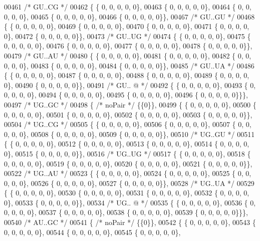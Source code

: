 \begin{DoxyCode}
00461  \textcolor{comment}{/* GU..CG */}
00462 \{ \{  0, 0, 0, 0, 0\},
00463 \{  0, 0, 0, 0, 0\},
00464 \{  0, 0, 0, 0, 0\},
00465 \{  0, 0, 0, 0, 0\},
00466 \{  0, 0, 0, 0, 0\}\},
00467  \textcolor{comment}{/* GU..GU */}
00468 \{ \{  0, 0, 0, 0, 0\},
00469 \{  0, 0, 0, 0, 0\},
00470 \{  0, 0, 0, 0, 0\},
00471 \{  0, 0, 0, 0, 0\},
00472 \{  0, 0, 0, 0, 0\}\},
00473  \textcolor{comment}{/* GU..UG */}
00474 \{ \{  0, 0, 0, 0, 0\},
00475 \{  0, 0, 0, 0, 0\},
00476 \{  0, 0, 0, 0, 0\},
00477 \{  0, 0, 0, 0, 0\},
00478 \{  0, 0, 0, 0, 0\}\},
00479  \textcolor{comment}{/* GU..AU */}
00480 \{ \{  0, 0, 0, 0, 0\},
00481 \{  0, 0, 0, 0, 0\},
00482 \{  0, 0, 0, 0, 0\},
00483 \{  0, 0, 0, 0, 0\},
00484 \{  0, 0, 0, 0, 0\}\},
00485  \textcolor{comment}{/* GU..UA */}
00486 \{ \{  0, 0, 0, 0, 0\},
00487 \{  0, 0, 0, 0, 0\},
00488 \{  0, 0, 0, 0, 0\},
00489 \{  0, 0, 0, 0, 0\},
00490 \{  0, 0, 0, 0, 0\}\},
00491  \textcolor{comment}{/* GU.. @ */}
00492 \{ \{  0, 0, 0, 0, 0\},
00493 \{  0, 0, 0, 0, 0\},
00494 \{  0, 0, 0, 0, 0\},
00495 \{  0, 0, 0, 0, 0\},
00496 \{  0, 0, 0, 0, 0\}\}\},
00497  \textcolor{comment}{/* UG..GC */}
00498 \{ \textcolor{comment}{/* noPair */} \{\{0\}\},
00499 \{ \{  0, 0, 0, 0, 0\},
00500 \{  0, 0, 0, 0, 0\},
00501 \{  0, 0, 0, 0, 0\},
00502 \{  0, 0, 0, 0, 0\},
00503 \{  0, 0, 0, 0, 0\}\},
00504  \textcolor{comment}{/* UG..CG */}
00505 \{ \{  0, 0, 0, 0, 0\},
00506 \{  0, 0, 0, 0, 0\},
00507 \{  0, 0, 0, 0, 0\},
00508 \{  0, 0, 0, 0, 0\},
00509 \{  0, 0, 0, 0, 0\}\},
00510  \textcolor{comment}{/* UG..GU */}
00511 \{ \{  0, 0, 0, 0, 0\},
00512 \{  0, 0, 0, 0, 0\},
00513 \{  0, 0, 0, 0, 0\},
00514 \{  0, 0, 0, 0, 0\},
00515 \{  0, 0, 0, 0, 0\}\},
00516  \textcolor{comment}{/* UG..UG */}
00517 \{ \{  0, 0, 0, 0, 0\},
00518 \{  0, 0, 0, 0, 0\},
00519 \{  0, 0, 0, 0, 0\},
00520 \{  0, 0, 0, 0, 0\},
00521 \{  0, 0, 0, 0, 0\}\},
00522  \textcolor{comment}{/* UG..AU */}
00523 \{ \{  0, 0, 0, 0, 0\},
00524 \{  0, 0, 0, 0, 0\},
00525 \{  0, 0, 0, 0, 0\},
00526 \{  0, 0, 0, 0, 0\},
00527 \{  0, 0, 0, 0, 0\}\},
00528  \textcolor{comment}{/* UG..UA */}
00529 \{ \{  0, 0, 0, 0, 0\},
00530 \{  0, 0, 0, 0, 0\},
00531 \{  0, 0, 0, 0, 0\},
00532 \{  0, 0, 0, 0, 0\},
00533 \{  0, 0, 0, 0, 0\}\},
00534  \textcolor{comment}{/* UG.. @ */}
00535 \{ \{  0, 0, 0, 0, 0\},
00536 \{  0, 0, 0, 0, 0\},
00537 \{  0, 0, 0, 0, 0\},
00538 \{  0, 0, 0, 0, 0\},
00539 \{  0, 0, 0, 0, 0\}\}\},
00540  \textcolor{comment}{/* AU..GC */}
00541 \{ \textcolor{comment}{/* noPair */} \{\{0\}\},
00542 \{ \{  0, 0, 0, 0, 0\},
00543 \{  0, 0, 0, 0, 0\},
00544 \{  0, 0, 0, 0, 0\},
00545 \{  0, 0, 0, 0, 0\},

\end{DoxyCode}
